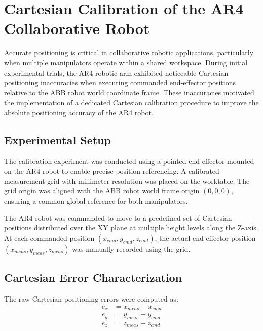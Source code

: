 \section{Cartesian Calibration of the AR4 Collaborative Robot}

\thispagestyle{fancy}
\vspace*{0cm} %
\label{sec:ar4_calibration}

Accurate positioning is critical in collaborative robotic applications, particularly when multiple manipulators operate within a shared workspace. During initial experimental trials, the AR4 robotic arm exhibited noticeable Cartesian positioning inaccuracies when executing commanded end-effector positions relative to the ABB robot world coordinate frame. These inaccuracies motivated the implementation of a dedicated Cartesian calibration procedure to improve the absolute positioning accuracy of the AR4 robot.

\subsection{Experimental Setup}

The calibration experiment was conducted using a pointed end-effector mounted on the AR4 robot to enable precise position referencing. A calibrated measurement grid with millimeter resolution was placed on the worktable. The grid origin was aligned with the ABB robot world frame origin $(0,0,0)$, ensuring a common global reference for both manipulators.

The AR4 robot was commanded to move to a predefined set of Cartesian positions distributed over the XY plane at multiple height levels along the Z-axis. At each commanded position $(x_{cmd}, y_{cmd}, z_{cmd})$, the actual end-effector position $(x_{meas}, y_{meas}, z_{meas})$ was manually recorded using the grid.

\subsection{Cartesian Error Characterization}

The raw Cartesian positioning errors were computed as:
\begin{equation}
\begin{aligned}
e_x &= x_{meas} - x_{cmd} \\
e_y &= y_{meas} - y_{cmd} \\
e_z &= z_{meas} - z_{cmd}
\end{aligned}
\end{equation}

